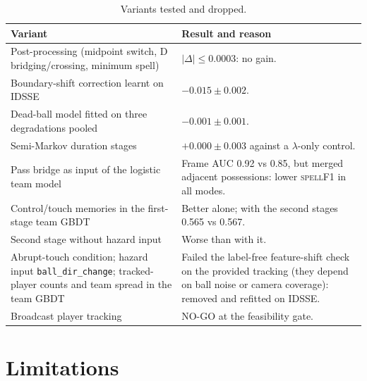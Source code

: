 \documentclass[journal]{IEEEtran}
\newcommand{\spf}{\textsc{spellF1}}
\begin{document}
\begin{table}[t]
\caption{Variants tested and dropped.}
\label{tab:rejected}
\centering
\footnotesize
\begin{tabular}{@{}>{\raggedright\arraybackslash}p{3.3cm}>{\raggedright\arraybackslash}p{4.7cm}@{}}
\toprule
Variant & Result and reason\\
\midrule
Post-processing (midpoint switch, D bridging/crossing, minimum spell) & $|\Delta|\le0.0003$: no gain.\\
Boundary-shift correction learnt on IDSSE & $-0.015\pm0.002$.\\
Dead-ball model fitted on three degradations pooled & $-0.001\pm0.001$.\\
Semi-Markov duration stages & $+0.000\pm0.003$ against a $\lambda$-only control.\\
Pass bridge as input of the logistic team model & Frame AUC 0.92 vs 0.85, but merged adjacent possessions: lower \spf{} in all modes.\\
Control/touch memories in the first-stage team GBDT & Better alone; with the second stages 0.565 vs 0.567.\\
Second stage without hazard input & Worse than with it.\\
Abrupt-touch condition; hazard input \texttt{ball\_dir\_change}; tracked-player counts and team spread in the team GBDT & Failed the label-free feature-shift check on the provided tracking (they depend on ball noise or camera coverage): removed and refitted on IDSSE.\\
Broadcast player tracking & NO-GO at the feasibility gate.\\
\bottomrule
\end{tabular}
\end{table}

\section{Limitations}
\label{sec:limits}
\end{document}
